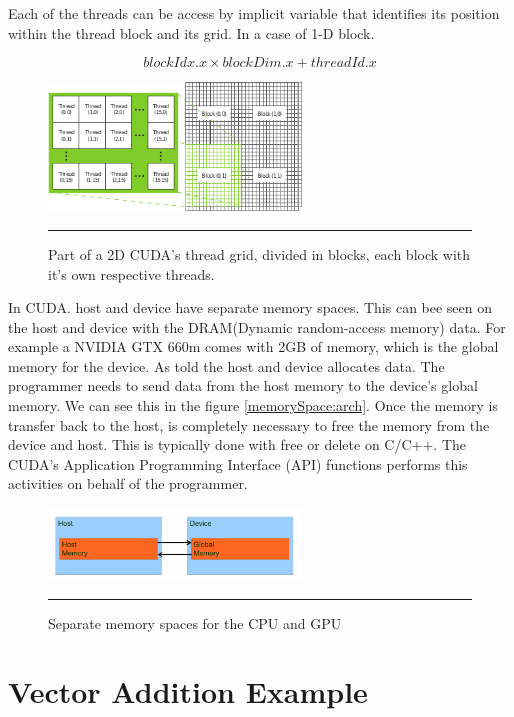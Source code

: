 Each of the threads can be access by implicit variable that identifies its position within the thread block and its grid. In a case of 1-D block. \cite{example}

$$blockIdx.x \times blockDim.x + threadId.x$$

\begin{figure}[htbp]
	\centering
		\includegraphics[width=0.6\textwidth]{Figures/grid.png}
		\rule{35em}{0.5pt}
	\caption[Part of the CUDA's 2D grid]{Part of a 2D CUDA's thread grid, divided in blocks, each block with it’s own respective threads.}
	\label{fig:grid}
\end{figure}

In CUDA. host and device have separate memory spaces. This can bee seen on the host and device with the DRAM(Dynamic random-access memory) data. For example a NVIDIA GTX 660m comes with 2GB of memory, which is the global memory for the device. As told the host and device allocates data. The programmer needs to send data from the host memory to the device's global memory. We can see this in the figure  \ref{memorySpace:arch}.  Once the memory is transfer back to the host, is completely necessary to free the memory from the device and host. This is typically done with free or delete on C/C++. The CUDA's Application Programming Interface (API) functions performs this activities on behalf of the programmer.   \cite{hwu}

\begin{figure}[htbp]
	\centering
		\includegraphics[width=0.6\textwidth]{Figures/memorySpace.png}
		\rule{35em}{0.5pt}
	\caption[Memory Space GPU and CPU]{Separate memory spaces for the CPU and GPU}
	\label{fig:memorySpace}
\end{figure}

\section{Vector Addition Example}

